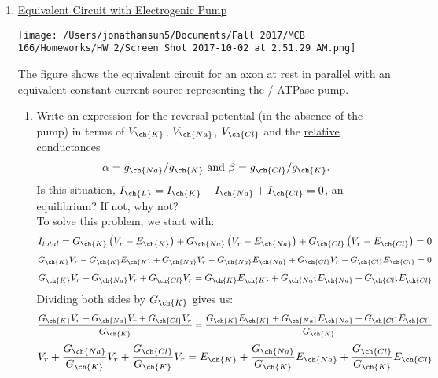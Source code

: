 \documentclass[11pt]{article}
\begin{document}
\begin{enumerate}[label=\arabic*.]
\newpage
\item
\underline{Equivalent Circuit with Electrogenic Pump}
\begin{center}
\texttt{[image: /Users/jonathansun5/Documents/Fall 2017/MCB 166/Homeworks/HW 2/Screen Shot 2017-10-02 at 2.51.29 AM.png]}
\end{center}
The figure shows the equivalent circuit for an axon at rest in parallel with an equivalent constant-current source representing the /-ATPase pump.
\begin{enumerate}[label=(\alph*)]
\item
Write an expression for the reversal potential (in the absence of the pump) in terms of $V_{\ch{K}}$, $V_{\ch{Na}}$, $V_{\ch{Cl}}$ and the \underline{relative} conductances
\begin{align*}
\alpha = g_{\ch{Na}} / g_{\ch{K}} \text{ and } \beta = g_{\ch{Cl}} / g_{\ch{K}}.
\end{align*}
Is this situation, $I_{\ch{L}} = I_{\ch{K}} + I_{\ch{Na}} + I_{\ch{Cl}} = 0$, an equilibrium? If not, why not?
\vspace*{1\baselineskip}
\\
To solve this problem, we start with:
\begin{align*}
I_{total} = G_{\ch{K}} \left(V_r - E_{\ch{K}}\right) + G_{\ch{Na}} \left(V_r - E_{\ch{Na}}\right) + G_{\ch{Cl}} \left(V_r - E_{\ch{Cl}}\right) = 0
\end{align*}
\begin{align*}
G_{\ch{K}} V_r - G_{\ch{K}} E_{\ch{K}} + G_{\ch{Na}} V_r - G_{\ch{Na}} E_{\ch{Na}} + G_{\ch{Cl}} V_r - G_{\ch{Cl}} E_{\ch{Cl}} = 0
\end{align*}
\begin{align*}
G_{\ch{K}} V_r + G_{\ch{Na}} V_r + G_{\ch{Cl}} V_r = G_{\ch{K}} E_{\ch{K}} + G_{\ch{Na}} E_{\ch{Na}} + G_{\ch{Cl}} E_{\ch{Cl}}
\end{align*}
Dividing both sides by $G_{\ch{K}}$ gives us:
\begin{align*}
\frac{G_{\ch{K}} V_r + G_{\ch{Na}} V_r + G_{\ch{Cl}} V_r} {G_{\ch{K}}} = \frac {G_{\ch{K}} E_{\ch{K}} + G_{\ch{Na}} E_{\ch{Na}} + G_{\ch{Cl}} E_{\ch{Cl}}} {G_{\ch{K}}}
\end{align*}
\begin{align*}
V_r + \frac{G_{\ch{Na}}} {G_{\ch{K}}} V_r + \frac{G_{\ch{Cl}}} {G_{\ch{K}}} V_r = E_{\ch{K}} + \frac{G_{\ch{Na}}} {G_{\ch{K}}} E_{\ch{Na}} + \frac{G_{\ch{Cl}}} {G_{\ch{K}}} E_{\ch{Cl}}
\end{align*}

\end{enumerate}
\end{enumerate}
\end{document}
